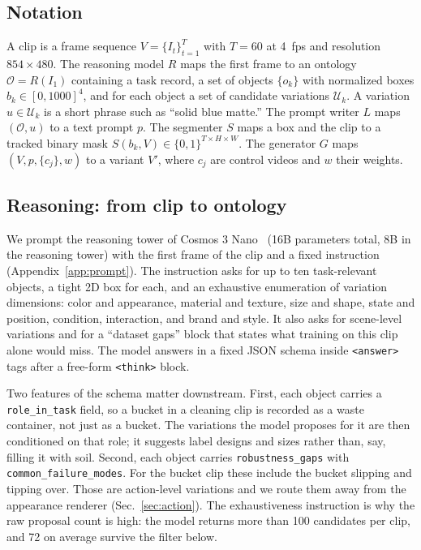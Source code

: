 \subsection{Notation}
A clip is a frame sequence $V=\{I_t\}_{t=1}^{T}$ with $T=60$ at 4~fps and resolution $854\times480$. The reasoning model $R$ maps the first frame to an ontology $\mathcal{O}=R(I_1)$ containing a task record, a set of objects $\{o_k\}$ with normalized boxes $b_k\in[0,1000]^4$, and for each object a set of candidate variations $\mathcal{U}_k$. A variation $u\in\mathcal{U}_k$ is a short phrase such as ``solid blue matte.'' The prompt writer $L$ maps $(\mathcal{O},u)$ to a text prompt $p$. The segmenter $S$ maps a box and the clip to a tracked binary mask $S(b_k,V)\in\{0,1\}^{T\times H\times W}$. The generator $G$ maps $(V,p,\{c_j\},w)$ to a variant $V'$, where $c_j$ are control videos and $w$ their weights.

\subsection{Reasoning: from clip to ontology}
\label{sec:reason}
We prompt the reasoning tower of Cosmos 3 Nano~\cite{cosmos3,cosmos3nano} (16B parameters total, 8B in the reasoning tower) with the first frame of the clip and a fixed instruction (Appendix~\ref{app:prompt}). The instruction asks for up to ten task-relevant objects, a tight 2D box for each, and an exhaustive enumeration of variation dimensions: color and appearance, material and texture, size and shape, state and position, condition, interaction, and brand and style. It also asks for scene-level variations and for a ``dataset gaps'' block that states what training on this clip alone would miss. The model answers in a fixed JSON schema inside \texttt{<answer>} tags after a free-form \texttt{<think>} block.

Two features of the schema matter downstream. First, each object carries a \texttt{role\_in\_task} field, so a bucket in a cleaning clip is recorded as a waste container, not just as a bucket. The variations the model proposes for it are then conditioned on that role; it suggests label designs and sizes rather than, say, filling it with soil. Second, each object carries \texttt{robustness\_gaps} with \texttt{common\_failure\_modes}. For the bucket clip these include the bucket slipping and tipping over. Those are action-level variations and we route them away from the appearance renderer (Sec.~\ref{sec:action}). The exhaustiveness instruction is why the raw proposal count is high: the model returns more than 100 candidates per clip, and 72 on average survive the filter below.

